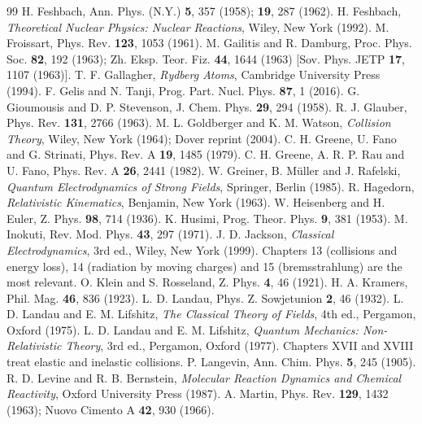 \documentclass[11pt,a4paper]{book}
\numberwithin{equation}{chapter}
\begin{document}
\begin{thebibliography}{99}
 H. Feshbach, Ann. Phys. (N.Y.) \textbf{5}, 357 (1958); \textbf{19}, 287 (1962).
 H. Feshbach, \emph{Theoretical Nuclear Physics: Nuclear Reactions}, Wiley, New York (1992).
 M. Froissart, Phys. Rev. \textbf{123}, 1053 (1961).
 M. Gailitis and R. Damburg, Proc. Phys. Soc. \textbf{82}, 192 (1963); Zh. Eksp. Teor. Fiz. \textbf{44}, 1644 (1963) [Sov. Phys. JETP \textbf{17}, 1107 (1963)].
 T. F. Gallagher, \emph{Rydberg Atoms}, Cambridge University Press (1994).
 F. Gelis and N. Tanji, Prog. Part. Nucl. Phys. \textbf{87}, 1 (2016).
 G. Gioumousis and D. P. Stevenson, J. Chem. Phys. \textbf{29}, 294 (1958).
 R. J. Glauber, Phys. Rev. \textbf{131}, 2766 (1963).
 M. L. Goldberger and K. M. Watson, \emph{Collision Theory}, Wiley, New York (1964); Dover reprint (2004).
 C. H. Greene, U. Fano and G. Strinati, Phys. Rev. A \textbf{19}, 1485 (1979).
 C. H. Greene, A. R. P. Rau and U. Fano, Phys. Rev. A \textbf{26}, 2441 (1982).
 W. Greiner, B. M\"uller and J. Rafelski, \emph{Quantum Electrodynamics of Strong Fields}, Springer, Berlin (1985).
 R. Hagedorn, \emph{Relativistic Kinematics}, Benjamin, New York (1963).
 W. Heisenberg and H. Euler, Z. Phys. \textbf{98}, 714 (1936).
 K. Husimi, Prog. Theor. Phys. \textbf{9}, 381 (1953).
 M. Inokuti, Rev. Mod. Phys. \textbf{43}, 297 (1971).
 J. D. Jackson, \emph{Classical Electrodynamics}, 3rd ed., Wiley, New York (1999). Chapters 13 (collisions and energy loss), 14 (radiation by moving charges) and 15 (bremsstrahlung) are the most relevant.
 O. Klein and S. Rosseland, Z. Phys. \textbf{4}, 46 (1921).
 H. A. Kramers, Phil. Mag. \textbf{46}, 836 (1923).
 L. D. Landau, Phys. Z. Sowjetunion \textbf{2}, 46 (1932).
 L. D. Landau and E. M. Lifshitz, \emph{The Classical Theory of Fields}, 4th ed., Pergamon, Oxford (1975).
 L. D. Landau and E. M. Lifshitz, \emph{Quantum Mechanics: Non-Relativistic Theory}, 3rd ed., Pergamon, Oxford (1977). Chapters XVII and XVIII treat elastic and inelastic collisions.
 P. Langevin, Ann. Chim. Phys. \textbf{5}, 245 (1905).
 R. D. Levine and R. B. Bernstein, \emph{Molecular Reaction Dynamics and Chemical Reactivity}, Oxford University Press (1987).
 A. Martin, Phys. Rev. \textbf{129}, 1432 (1963); Nuovo Cimento A \textbf{42}, 930 (1966).

\end{thebibliography}
\end{document}
